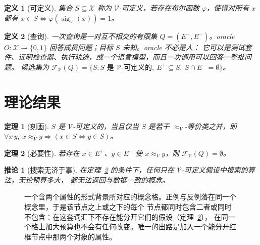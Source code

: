 \documentclass[11pt]{ctexart}
\newtheorem{definition}{定义}
\newtheorem{theorem}{定理}
\newtheorem{corollary}{推论}
\newcommand{\sig}{\operatorname{sig}}
\newcommand{\Indist}{\approx_{V}}
\newcommand{\Vocab}{\mathcal{V}}
\newcommand{\dom}{\mathcal{X}}
\newcommand{\Epos}{E^{+}}
\newcommand{\Eneg}{E^{-}}
\begin{document}
\begin{definition}[可定义]
集合 $S \subseteq \dom$ 称为 \emph{$\Vocab$-可定义}，若存在布尔函数 $\varphi$，使得对所有 $x$
都有 $x \in S \iff \varphi(\sig_{\Vocab}(x)) = 1$。
\end{definition}

\begin{definition}[查询]
一次查询是一对互不相交的有限集 $Q = (\Epos, \Eneg)$。\emph{oracle}
$O \colon \dom \rightharpoonup \{0,1\}$ 回答成员问题；目标 $S$ 未知。oracle 不必是人：
它可以是测试套件、证明检查器、执行轨迹，或一个语言模型，而且一次调用可以回答一整批问题。
\emph{候选集}为
$\mathcal{F}_{\Vocab}(Q) = \{S : S \text{ 是 } \Vocab\text{-可定义的},\ \Epos \subseteq S,\ S \cap \Eneg = \emptyset\}$。
\end{definition}

\section{理论结果}

\begin{theorem}[刻画]\label{thm:char}
$S$ 是 $\Vocab$-可定义的，当且仅当 $S$ 是若干 $\Indist$-等价类之并，即
$\forall x\,y,\ x \Indist y \Rightarrow (x \in S \iff y \in S)$。
\end{theorem}

\begin{theorem}[必要性]\label{thm:necessary}
若存在 $x \in \Epos$、$y \in \Eneg$ 使 $x \Indist y$，则 $\mathcal{F}_{\Vocab}(Q) = \emptyset$。
\end{theorem}

\begin{corollary}[搜索无济于事]
在定理~\ref{thm:necessary} 的条件下，任何只在 $\Vocab$-可定义假设中搜索的算法，无论预算多大，
都无法返回与数据一致的概念。
\end{corollary}

\begin{figure}[t]
\centering
{}
\caption{一个含两个属性的形式背景所对应的概念格。正例与反例落在同一个概念里，于是该节点之上或之下的每个
节点都同时包含二者或同时不包含：在这套词汇下不存在能分开它们的假设（定理~\ref{thm:necessary}），
在同一个格上加大预算也不会有任何改变。唯一的出路是加入一个能分开红框节点中那两个对象的属性。}
\label{fig:collision}
\end{figure}
\end{document}
